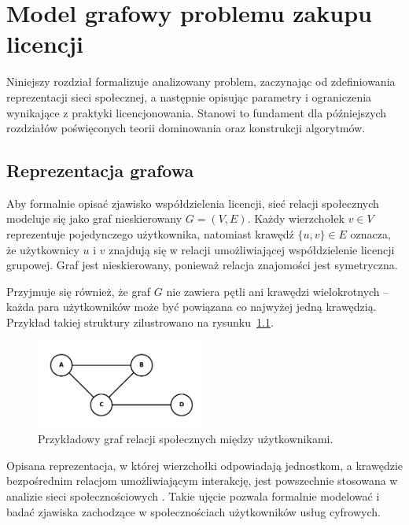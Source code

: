 \chapter{Model grafowy problemu zakupu licencji}

Niniejszy rozdział formalizuje analizowany problem, zaczynając od zdeﬁniowania reprezentacji sieci społecznej, a następnie opisując parametry i ograniczenia wynikające z praktyki licencjonowania. Stanowi to fundament dla późniejszych rozdziałów poświęconych teorii dominowania oraz konstrukcji algorytmów.

\section{Reprezentacja grafowa}

Aby formalnie opisać zjawisko współdzielenia licencji, sieć relacji społecznych modeluje się jako graf nieskierowany \( G = (V, E) \). Każdy wierzchołek \( v \in V \) reprezentuje pojedynczego użytkownika, natomiast krawędź \( \{u, v\} \in E \) oznacza, że użytkownicy \( u \) i \( v \) znajdują się w relacji umożliwiającej współdzielenie licencji grupowej. Graf jest nieskierowany, ponieważ relacja znajomości jest symetryczna.

Przyjmuje się również, że graf \( G \) nie zawiera pętli ani krawędzi wielokrotnych -- każda para użytkowników może być powiązana co najwyżej jedną krawędzią. Przykład takiej struktury zilustrowano na rysunku~\ref{fig:social_graph}.

\begin{figure}[H]
  \centering
  \includegraphics[width=0.5\textwidth]{assets/graphmodelexample.png}
  \caption{Przykładowy graf relacji społecznych między użytkownikami.}
  \label{fig:social_graph}
\end{figure}

Opisana reprezentacja, w której wierzchołki odpowiadają jednostkom, a krawędzie bezpośrednim relacjom umożliwiającym interakcję, jest powszechnie stosowana w analizie sieci społecznościowych \cite{Brandes2004, NETTLETON20131}. Takie ujęcie pozwala formalnie modelować i badać zjawiska zachodzące w społecznościach użytkowników usług cyfrowych.

